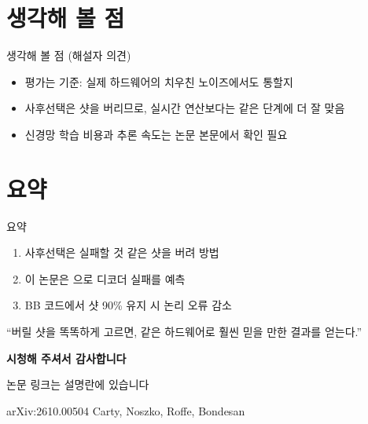 \section{생각해 볼 점}

\begin{frame}{생각해 볼 점 (해설자 의견)}
  \begin{itemize}
    \item 평가는  기준: 실제 하드웨어의 치우친 노이즈에서도 통할지
    \item 사후선택은 샷을 버리므로, 실시간 연산보다는  같은 단계에 더 잘 맞음
    \item 신경망 학습 비용과 추론 속도는 논문 본문에서 확인 필요
  \end{itemize}
\end{frame}

\renewcommand{\secblurb}{오늘 내용을 세 줄로}
\section{요약}

\begin{frame}{요약}
  \begin{enumerate}
    \item 사후선택은 실패할 것 같은 샷을 버려  방법
    \item 이 논문은 으로 디코더 실패를  예측
    \item BB 코드에서 샷 90\% 유지 시 논리 오류  감소
  \end{enumerate}
  \begin{callout}[한 줄 정리]
    ``버릴 샷을 똑똑하게 고르면, 같은 하드웨어로 훨씬 믿을 만한 결과를 얻는다.''
  \end{callout}
\end{frame}

\begin{frame}[plain,c]
  \centering
  {\fontsize{30}{36}\selectfont\bfseries\color{emph} 시청해 주셔서 감사합니다}

  \deckgap
  {\large 논문 링크는 설명란에 있습니다}

  \deckgap
  {\color{sustechgrey}\footnotesize arXiv:2610.00504 \metasep Carty, Noszko, Roffe, Bondesan}
\end{frame}


